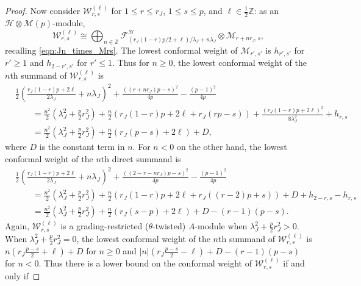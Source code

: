 \documentclass[11pt, reqno]{amsart}
\theoremstyle{definition}\newtheorem{defi}[thm]{Definition}
\theoremstyle{definition}\newtheorem{rem}[thm]{Remark}
\theoremstyle{definition}\newtheorem{exam}[thm]{Example}
\theoremstyle{definition}\newtheorem{assum}[thm]{Assumption}
\newcommand{\cH}{\mathcal{H}}
\newcommand{\cM}{\mathcal{M}}
\newcommand{\cF}{\mathcal{F}}
\newcommand{\cW}{\mathcal{W}}
\newcommand{\ZZ}{\mathbb{Z}}
\begin{document}
\begin{proof}
Now consider $\cW_{r,s}^{(\ell)}$ for $1\leq r\leq r_J$, $1\leq s\leq p$, and $\ell\in\frac{1}{2}\ZZ$: as an $\cH\otimes\cM(p)$-module, 
\begin{equation}\label{eqn:Wrsl_weight_decomp}
\cW_{r,s}^{(\ell)}\cong\bigoplus_{n\in\ZZ} \cF^\cH_{(r_J(1-r)p/2+\ell)/\lambda_J+n\lambda_J}\otimes\cM_{r+nr_J,s},
\end{equation} 
recalling \eqref{eqn:Jn_times_Mrs}. The lowest conformal weight of $\cM_{r',s'}$ is $h_{r',s'}$ for $r'\geq 1$ and $h_{2-r',s'}$ for $r'\leq 1$. Thus for $n\geq 0$, the lowest conformal weight of the $n$th summand of $\cW_{r,s}^{(\ell)}$ is
\begin{align}\label{eqn:h(rsl)_n_positive}
&\frac{1}{2}\left(\frac{r_J(1-r)p+2\ell}{2\lambda_J}+n\lambda_J\right)^2 + \frac{\left((r+nr_J)p-s\right)^2}{4p}-\frac{(p-1)^2}{4p}  \nonumber\\
&\hspace{2em} = \frac{n^2}{2}\left(\lambda_J^2+\frac{p}{2}r_J^2\right)+\frac{n}{2}\left(r_J(1-r)p+2\ell+r_J(rp-s)\right)+\frac{(r_J(1-r)p+2\ell)^2}{8\lambda_J^2}+h_{r,s}\nonumber\\
&\hspace{2em} =\frac{n^2}{2}\left(\lambda_J^2+\frac{p}{2}r_J^2\right)+\frac{n}{2}\left(r_J(p-s)+2\ell\right)+D,
\end{align}
where $D$ is the constant term in $n$. For $n<0$ on the other hand, the lowest conformal weight of the $n$th direct summand is
\begin{align}\label{eqn:h(rsl)_n_negative}
&\frac{1}{2}\left(\frac{r_J(1-r)p+2\ell}{2\lambda_J}+n\lambda_J\right)^2 + \frac{\left((2-r-nr_J)p-s\right)^2}{4p}-\frac{(p-1)^2}{4p}  \nonumber\\
&\hspace{2em} = \frac{n^2}{2}\left(\lambda_J^2+\frac{p}{2}r_J^2\right)+\frac{n}{2}\left(r_J(1-r)p+2\ell+r_J((r-2)p+s)\right)+D+h_{2-r,s}-h_{r,s}\nonumber\\
& \hspace{2em} = \frac{n^2}{2}\left(\lambda_J^2+\frac{p}{2}r_J^2\right)+\frac{n}{2}\left(r_J(s-p)+2\ell\right)+D-(r-1)(p-s).
\end{align}
Again, $\cW_{r,s}^{(\ell)}$ is a grading-restricted ($\theta$-twisted) $A$-module when $\lambda_J^2+\frac{p}{2}r_J^2>0$. When $\lambda_J^2+\frac{p}{2}r_J^2=0$, the lowest conformal weight of the $n$th summand of $\cW_{r,s}^{(\ell)}$ is $n(r_J\frac{p-s}{2}+\ell)+D$ for $n\geq 0$ and $\vert n\vert(r_J\frac{p-s}{2}-\ell)+D-(r-1)(p-s)$ for $n<0$. Thus there is a lower bound on the conformal weight of $\cW_{r,s}^{(\ell)}$ if and only if

\end{proof}
\end{document}

